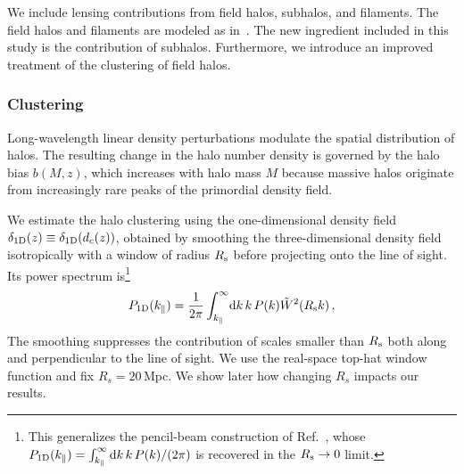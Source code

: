 \documentclass[aps,prd,10pt,nofootinbib,twocolumn,superscriptaddress,floatfix,notitlepage]{revtex4-1}
\newcommand{\td}{{\rm d}}
\newcommand{\be}{\begin{equation}}
\newcommand{\ee}{\end{equation}}
\begin{document}
We include lensing contributions from field halos, subhalos, and filaments. The field halos and filaments are modeled as in~\cite{Vaskonen:2026ubd}. The new ingredient included in this study is the contribution of subhalos. Furthermore, we introduce an improved treatment of the clustering of field halos.

\subsubsection{Clustering}

Long-wavelength linear density perturbations modulate the spatial distribution of halos. The resulting change in the halo number density is governed by the halo bias $b(M,z)$, which increases with halo mass $M$ because massive  halos originate from increasingly rare peaks of the primordial density field. 

We estimate the halo clustering using the one-dimensional density field $\delta_{\rm 1D}(z) \equiv \delta_{\rm 1D}(d_c(z))$, obtained by smoothing the three-dimensional density field isotropically with a window of radius $R_{\rm s}$ before projecting onto the line of sight. Its power spectrum is\footnote{This generalizes the pencil-beam construction of Ref.~\cite{1991ApJ...379..482K}, whose $P_{\rm 1D}(k_\parallel)=\int_{k_\parallel}^\infty \td k\,k\,P(k)/(2\pi)$ is recovered in the $R_{\rm s}\to0$ limit.}
\be
    P_{\rm 1D}(k_\parallel) = \frac{1}{2\pi} \int_{k_\parallel}^\infty \!\td k \, k \, P(k) \tilde{W}^2(R_{\rm s} k) \,,
\ee
The smoothing suppresses the contribution of scales smaller than $R_{\rm s}$ both along and perpendicular to the line of sight. We use the real-space top-hat window function and fix $R_s = 20\,$Mpc. We show later how changing $R_s$ impacts our results. 
\end{document}
